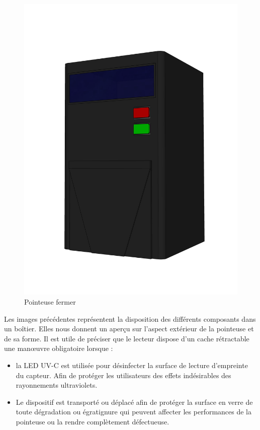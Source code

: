 \begin{figure}[!htb]
\begin{minipage}{0.5\textwidth}
         \includegraphics[scale=0.16]{images/prototype/4.png}
         \vspace{-40pt}
         \caption{Pointeuse fermer}\label{ }
       \end{minipage}
    \end{figure}


    Les images précédentes représentent la disposition des différents composants dans un boîtier. Elles nous donnent un aperçu sur l’aspect extérieur de la pointeuse et de sa forme. Il est utile de préciser que le lecteur dispose d’un cache rétractable une manœuvre obligatoire lorsque :
    \begin{itemize}
        \item [\textbullet] la LED UV-C est utilisée pour désinfecter la surface de lecture d’empreinte du capteur. Afin de protéger les utilisateurs des effets indésirables des rayonnements ultraviolets.
        \item [\textbullet]  Le dispositif est transporté ou déplacé afin de protéger la surface en verre de toute dégradation ou égratignure qui peuvent affecter les performances de la pointeuse ou la rendre complètement défectueuse.  
    \end{itemize}
    
